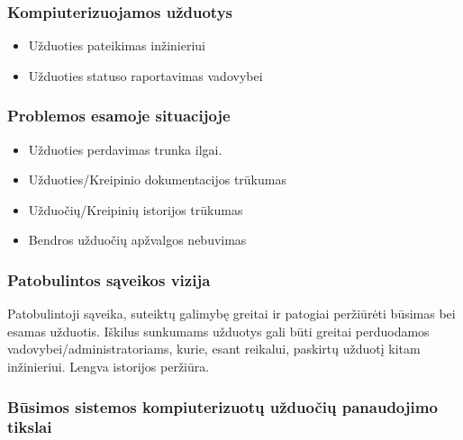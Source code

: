 		\subsubsection{Kompiuterizuojamos užduotys}
		
		\begin{itemize}
			\item Užduoties pateikimas inžinieriui
			\item Užduoties statuso raportavimas vadovybei
		\end{itemize}
		
		\subsubsection{Problemos esamoje situacijoje}
		
		\begin{itemize}
			\item Užduoties perdavimas trunka ilgai.
			\item Užduoties/Kreipinio dokumentacijos trūkumas
			\item Užduočių/Kreipinių istorijos trūkumas
			\item Bendros užduočių apžvalgos nebuvimas 
		\end{itemize}
		
		\subsubsection{Patobulintos sąveikos vizija}
		
		Patobulintoji sąveika, suteiktų galimybę greitai ir patogiai peržiūrėti būsimas bei esamas užduotis.
		Iškilus sunkumams užduotys gali būti greitai perduodamos vadovybei/administratoriams, kurie, esant reikalui, paskirtų užduotį kitam inžinieriui.
		Lengva istorijos peržiūra.
		
		\subsubsection{Būsimos sistemos kompiuterizuotų užduočių panaudojimo tikslai}

